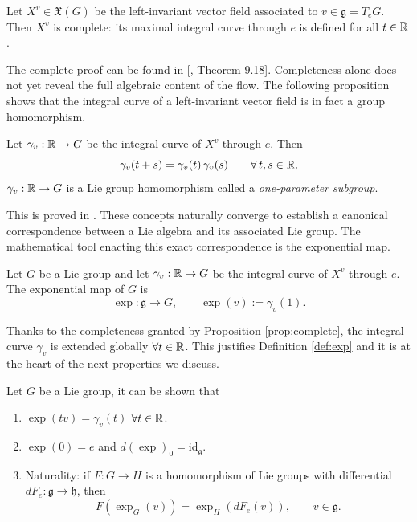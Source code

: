 \begin{proposition}\label{prop:complete}
	Let $X^v \in \mathfrak{X}(G)$ be the left-invariant vector field associated to $v \in \mathfrak{g} = T_eG$. Then $X^v$ is complete: its maximal integral curve through $e$ is defined for all $t \in \mathbb{R}$.
\end{proposition}

The complete proof can be found in [\cite{leeIntroductionSmoothManifolds2013}, Theorem 9.18]. Completeness alone does not yet reveal the full algebraic content of the flow. The following proposition shows that the integral curve of a left-invariant vector field is in fact a group homomorphism.

\begin{proposition}\label{prop:one-param}
	Let $\gamma_v:\mathbb{R}\to G$ be the integral curve of $X^v$ through $e$. Then
	\[
	\gamma_v(t+s) = \gamma_v(t)\,\gamma_v(s) \qquad \forall\, t,s \in \mathbb{R},
	\]
	$\gamma_v :\mathbb{R} \to G$ is a Lie group homomorphism called a \emph{one-parameter subgroup}.
\end{proposition}

This is proved in \cite[Theorem 20.1]{leeIntroductionSmoothManifolds2013}. These concepts naturally converge to establish a canonical correspondence between a Lie algebra and its associated Lie group. The mathematical tool enacting this exact correspondence is the exponential map.

\begin{definition}\label{def:exp}
	Let $G$ be a Lie group and let $\gamma_v:\mathbb{R} \to G$ be the integral curve of $X^v$ through $e$. The exponential map of $G$ is
	\[
	\exp: \mathfrak{g} \to G, \qquad \exp(v) := \gamma_v(1).
	\]
\end{definition}

Thanks to the completeness granted by Proposition \ref{prop:complete}, the integral curve $\gamma_v$ is extended globally $\forall t \in \mathbb{R}$. This justifies Definition \ref{def:exp} and it is at the heart of the next properties we discuss.

\begin{proposition}\label{prop:exp-props}
	Let $G$ be a Lie group, it can be shown that
	\begin{enumerate}
		\item $\exp(tv) = \gamma_v(t)$ $\forall t\in\mathbb{R}$.
		\item $\exp(0)=e$ and $d(\exp)_0 = \mathrm{id}_{\mathfrak g}$.
		\item Naturality: if $F:G\to H$ is a homomorphism of Lie groups with differential $dF_e:\mathfrak g\to\mathfrak h$, then
		\[
		F(\exp_G(v)) = \exp_H(dF_e(v)), \qquad v\in\mathfrak g.
		\]
	\end{enumerate}
\end{proposition}

